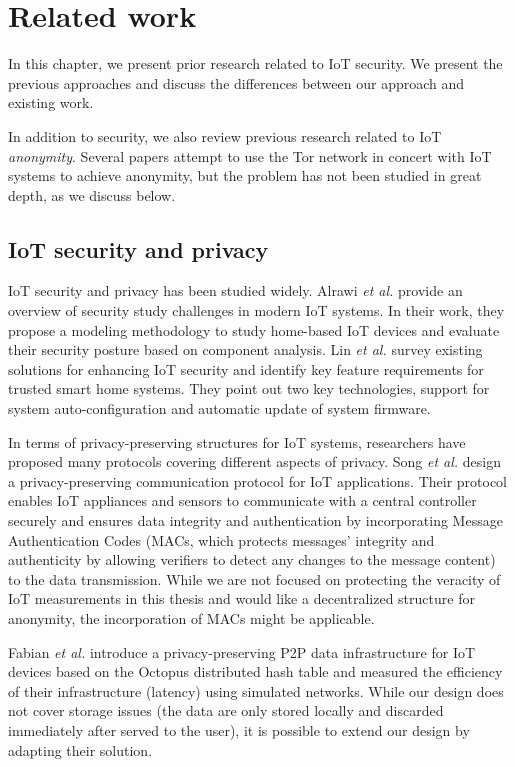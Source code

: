 \chapter{Related work}

In this chapter, we present prior research related to IoT security. We present the previous approaches and discuss the differences between our approach and existing work.

In addition to security, we also review previous research related to IoT \textit{anonymity}. Several papers attempt to use the Tor network in concert with IoT systems to achieve anonymity, but the problem has not been studied in great depth, as we discuss below. 

\section{IoT security and privacy}

IoT security and privacy has been studied widely. Alrawi \textit{et al.} \cite{alrawi2019sok} provide an overview of security study challenges in modern IoT systems. In their work, they propose a modeling methodology to study home-based IoT devices and evaluate their security posture based on component analysis. Lin \textit{et al.} \cite{lin2016iot} survey existing solutions for enhancing IoT security and identify key feature requirements for trusted smart home systems. They point out two key technologies, support for system auto-configuration and automatic update of system firmware. 


In terms of privacy-preserving structures for IoT systems, researchers have proposed many protocols covering different aspects of privacy. Song \textit{et al.} \cite{song2017privacy} design a privacy-preserving communication protocol for IoT applications. Their protocol enables IoT appliances and sensors to communicate with a central controller securely and ensures data integrity and authentication by incorporating Message Authentication Codes (MACs, which protects messages' integrity and authenticity by allowing verifiers to detect any changes to the message content) to the data transmission. While we are not focused on protecting the veracity of IoT measurements in this thesis and would like a decentralized structure for anonymity, the incorporation of MACs might be applicable.


Fabian \textit{et al.} \cite{fabian2014privacy} introduce a privacy-preserving P2P data infrastructure for IoT devices based on the Octopus distributed hash table \cite{wang2012octopus} and measured the efficiency of their infrastructure (latency) using simulated networks. While our design does not cover storage issues (the data are only stored locally and discarded immediately after served to the user), it is possible to extend our design by adapting their solution.


